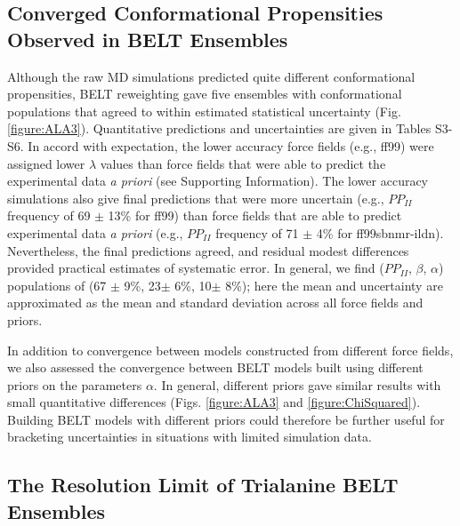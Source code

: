 \documentclass[12pt]{article}
\begin{document}
\subsection*{Converged Conformational Propensities Observed in BELT Ensembles}

Although the raw MD simulations predicted quite different conformational propensities, BELT reweighting gave five ensembles with conformational populations that agreed to within estimated statistical uncertainty (Fig. \ref{figure:ALA3}).  Quantitative predictions and uncertainties are given in Tables S3-S6.  In accord with expectation, the lower accuracy force fields (e.g., ff99) were assigned lower $\lambda$ values than force fields that were able to predict the experimental data {\it a priori} (see Supporting Information). The lower accuracy simulations also give final predictions that were more uncertain (e.g., $PP_{II}$ frequency of 69 $\pm$ 13\% for ff99) than force fields that are able to predict experimental data {\it a priori} (e.g., $PP_{II}$ frequency of 71 $\pm$ 4\% for ff99sbnmr-ildn). Nevertheless, the final predictions agreed, and residual modest differences provided practical estimates of systematic error.  In general, we find ($PP_{II}$, $\beta$, $\alpha$) populations of 
(67 $\pm$ 9\%, 23$\pm$ 6\%, 10$\pm$ 8\%); 
here the mean and uncertainty are approximated as the mean and standard deviation across all force fields and priors. 

In addition to convergence between models constructed from different force fields, we also assessed the convergence between BELT models built using different priors on the parameters $\alpha$.  In general, different priors gave similar results with small quantitative differences (Figs. \ref{figure:ALA3} and \ref{figure:ChiSquared}).  Building BELT models with different priors could therefore be further useful for bracketing uncertainties in situations with limited simulation data.  

\subsection*{The Resolution Limit of Trialanine BELT Ensembles}
\end{document}
